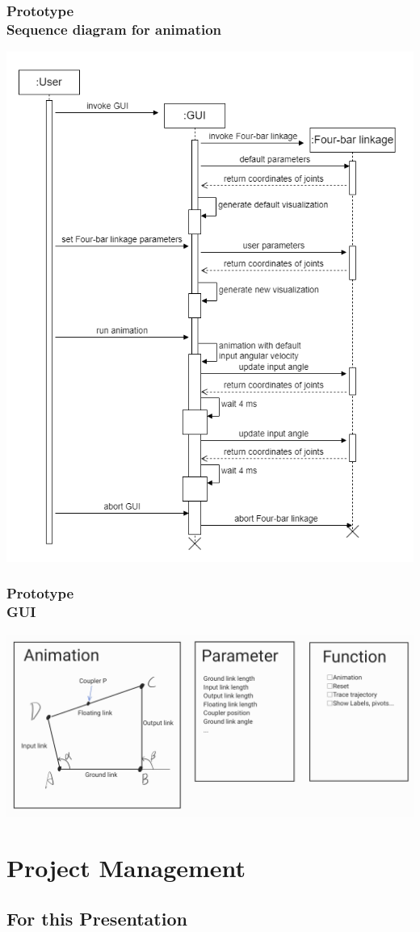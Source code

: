 \documentclass[ucs,10pt]{beamer}
\begin{document}
\begin{frame}
\frametitle{Prototype \\
    \small \color{rwth-blue} Sequence diagram for animation}
    \begin{center}
        \includegraphics[width=0.5\linewidth]{Used_Picture/sequence_diagramm_animation.png}
    \end{center}
\end{frame}

\begin{frame}
\frametitle{Prototype \\
    \small \color{rwth-blue} GUI}
    \begin{center}
        \includegraphics[width=0.5\linewidth]{Used_Picture/Prototype_1.jpg}
    \end{center}
\end{frame}


\section{Project Management}


\subsection{For this Presentation}
\end{document}
